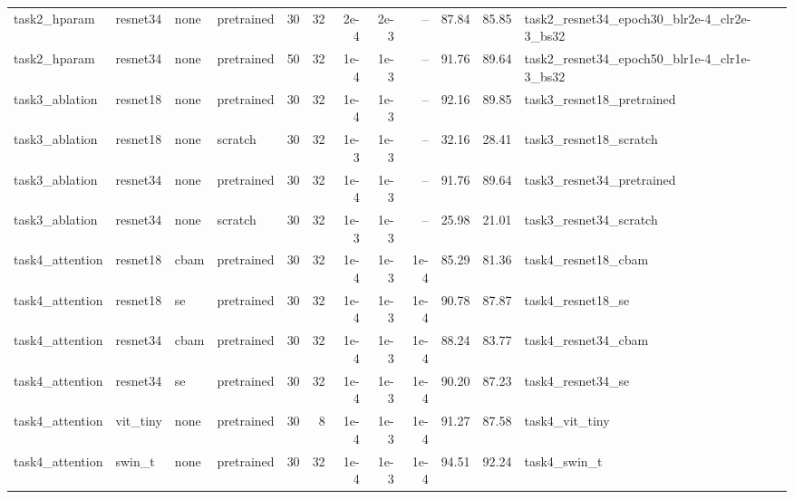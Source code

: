 {\begin{tabular}{llllrrrrrrrl}
task2\_hparam & resnet34 & none & pretrained & 30 & 32 & 2e-4 & 2e-3 & -- & 87.84 & 85.85 & task2\_resnet34\_epoch30\_blr2e-4\_clr2e-3\_bs32 \\
task2\_hparam & resnet34 & none & pretrained & 50 & 32 & 1e-4 & 1e-3 & -- & 91.76 & 89.64 & task2\_resnet34\_epoch50\_blr1e-4\_clr1e-3\_bs32 \\
task3\_ablation & resnet18 & none & pretrained & 30 & 32 & 1e-4 & 1e-3 & -- & 92.16 & 89.85 & task3\_resnet18\_pretrained \\
task3\_ablation & resnet18 & none & scratch & 30 & 32 & 1e-3 & 1e-3 & -- & 32.16 & 28.41 & task3\_resnet18\_scratch \\
task3\_ablation & resnet34 & none & pretrained & 30 & 32 & 1e-4 & 1e-3 & -- & 91.76 & 89.64 & task3\_resnet34\_pretrained \\
task3\_ablation & resnet34 & none & scratch & 30 & 32 & 1e-3 & 1e-3 & -- & 25.98 & 21.01 & task3\_resnet34\_scratch \\
task4\_attention & resnet18 & cbam & pretrained & 30 & 32 & 1e-4 & 1e-3 & 1e-4 & 85.29 & 81.36 & task4\_resnet18\_cbam \\
task4\_attention & resnet18 & se & pretrained & 30 & 32 & 1e-4 & 1e-3 & 1e-4 & 90.78 & 87.87 & task4\_resnet18\_se \\
task4\_attention & resnet34 & cbam & pretrained & 30 & 32 & 1e-4 & 1e-3 & 1e-4 & 88.24 & 83.77 & task4\_resnet34\_cbam \\
task4\_attention & resnet34 & se & pretrained & 30 & 32 & 1e-4 & 1e-3 & 1e-4 & 90.20 & 87.23 & task4\_resnet34\_se \\
task4\_attention & vit\_tiny & none & pretrained & 30 & 8 & 1e-4 & 1e-3 & 1e-4 & 91.27 & 87.58 & task4\_vit\_tiny \\
task4\_attention & swin\_t & none & pretrained & 30 & 32 & 1e-4 & 1e-3 & 1e-4 & 94.51 & 92.24 & task4\_swin\_t \\
\bottomrule
\end{tabular}
}%
